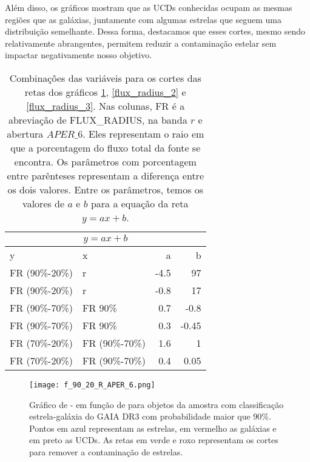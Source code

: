 Além disso, os gráficos mostram que as UCDs conhecidas ocupam as mesmas regiões que as galáxias, juntamente com algumas estrelas que seguem uma distribuição semelhante. Dessa forma, destacamos que esses cortes, mesmo sendo relativamente abrangentes, permitem reduzir a contaminação estelar sem impactar negativamente nosso objetivo.

\begin{table}[!ht]
    \centering
    \caption{Combinações das variáveis para os cortes das retas dos gráficos \ref{flux_radius_1}, \ref{flux_radius_2} e \ref{flux_radius_3}. Nas colunas, FR é a abreviação de FLUX\_RADIUS, na banda $r$ e abertura $APER\_6$. Eles representam o raio em que a porcentagem do fluxo total da fonte se encontra. Os parâmetros com porcentagem entre parênteses representam a diferença entre os dois valores. Entre os parâmetros, temos os valores de $a$ e $b$ para a equação da reta $y = ax + b$. }
        \begin{tabular}{l l r r}
        \hline
        \multicolumn{4}{c}{$y = ax + b$}\\
        \hline
        y & x & a & b\\
        \hline
        FR (90\%-20\%) & r & -4.5 & 97 \\
        FR (90\%-20\%) & r & -0.8 & 17 \\
        FR (90\%-70\%) & FR 90\% & 0.7 & -0.8 \\
        FR (90\%-70\%) & FR 90\% & 0.3 & -0.45 \\
        FR (70\%-20\%) & FR (90\%-70\%) & 1.6 & 1 \\
        FR (70\%-20\%) & FR (90\%-70\%) & 0.4 & 0.05 \\
        \hline
    \end{tabular}
    \label{cortes_flux_radius}
\end{table}

\begin{figure}[!ht]
    \begin{center}
    \texttt{[image: f\_90\_20\_R\_APER\_6.png]}
    \caption{Gráfico de  -  em função de  para objetos da amostra com classificação estrela-galáxia do GAIA DR3 com probabilidade maior que 90\%. Pontos em azul representam as estrelas, em vermelho as galáxias e em preto as UCDs. As retas em verde e roxo representam os cortes para remover a contaminação de estrelas.}
    \label{flux_radius_1}
    \end{center}
\end{figure}

